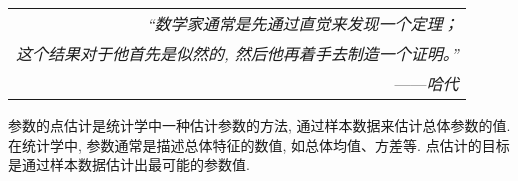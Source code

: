 \begin{flushright}
    \begin{tabular}{r|||}
        \textit{“数学家通常是先通过直觉来发现一个定理；}\\
        \textit{这个结果对于他首先是似然的, 然后他再着手去制造一个证明。”}\\
        ——\textit{哈代}
    \end{tabular}
\end{flushright}

参数的点估计是统计学中一种估计参数的方法, 通过样本数据来估计总体参数的值. 
在统计学中, 参数通常是描述总体特征的数值, 如总体均值、方差等. 点估计的目标是通过样本数据估计出最可能的参数值. 